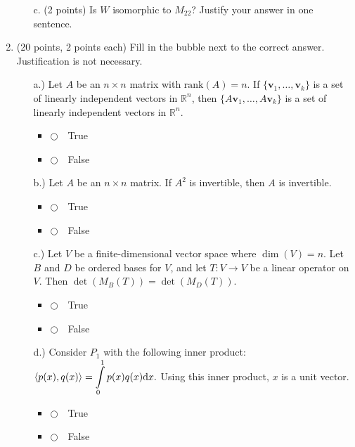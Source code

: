 \documentclass[12pt]{extarticle}
\newcommand{\chooseone}{{\Large$\Circle$\ \ }}
\begin{document}
\begin{enumerate}
\begin{itemize}
\item[c.] (2 points) Is $W$ isomorphic to $M_{22}$? Justify your answer in one sentence.




\vspace{1.5in}

\end{itemize}


    \newpage

      \item (20 points, 2 points each)  Fill in the bubble next to the correct answer. Justification is not necessary.
\begin{itemize}
\item[a.)] Let $A$ be an $n\times n$ matrix with $\text{rank}(A)=n$. If $\{\mathbf v_1,\dots,\mathbf v_k\}$ is a set of linearly independent vectors in $\mathbb R^n$, then $\{A\mathbf v_1,\dots,A\mathbf v_k\}$ is a set of linearly independent vectors in $\mathbb R^n$. 
\begin{itemize}[label={}]
\item \chooseone True
\item \chooseone False
\end{itemize}

\vspace{1.5cm}

\item[b.)] Let $A$ be an $n\times n$ matrix. If $A^2$ is invertible, then $A$ is invertible.
\begin{itemize}[label={}]
\item \chooseone True
\item \chooseone False
\end{itemize}
\vspace{1.5cm}

\item[c.)] Let $V$ be a finite-dimensional vector space where $\dim(V)=n$. Let $B$ and $D$ be ordered bases for $V$, and let $T:V\to V$ be a linear operator on $V$. Then $\det(M_B(T))=\det(M_D(T))$.


\begin{itemize}[label={}]
\item \chooseone True
\item \chooseone False
\end{itemize}
\vspace{1.5cm}

\item[d.) ] Consider $P_1$ with the following inner product: $\displaystyle \langle p(x), q(x)\rangle = \int\limits_0^1 p(x)q(x)\mathrm{d} x.$
Using this inner product, $x$ is a unit vector.
\begin{itemize}[label={}]
\item \chooseone True
\item \chooseone False
\end{itemize}
\vspace{1.5cm}


\end{itemize}
\end{enumerate}
\end{document}
